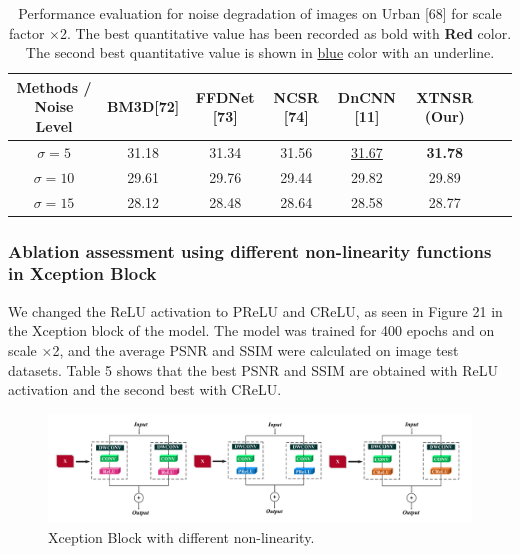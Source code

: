 \documentclass[twocolumn]{svjour3}          %
\begin{document}
\begin{table}
\centering
\caption{Performance evaluation for noise degradation of images on Urban [68] for scale factor $\times$2. The best quantitative value has been recorded as bold with {\color{red}\textbf{Red }} color. The second best quantitative value is shown in {\color{blue}\underline{blue}} color with an underline.}

\label{table4}
\setlength{\tabcolsep}{1 pt}
\begin{tabular}{|c|c|c|c|c|c|c|c|} %
\hline

\multirow{1}{*}{Methods / Noise Level} & \multirow{1}{*}{BM3D[72]} & \multirow{1}{*}{FFDNet [73]} & \multirow{1}{*}{NCSR [74]}  & \multirow{1}{*}{DnCNN [11]} & \multirow{1}{*}{XTNSR (Our)}\\

\hline
$\sigma = 5$ & {31.18} & {31.34} & {31.56} & {\color{blue}\underline{31.67}} & {\color{red}\textbf{31.78}}   \\
$\sigma = 10$ & {29.61} & {29.76} & {29.44} & {29.82} & {29.89}   \\
$\sigma = 15$ & {28.12} & {28.48} & {28.64} & {28.58} & {28.77}   \\
    
\hline
\end{tabular}
\end{table}

\subsubsection{Ablation assessment using different non-linearity functions in Xception Block}

We changed the ReLU activation to PReLU and CReLU, as seen in Figure 21 in the Xception block of the model. The model was trained for 400 epochs and on scale ×2, and the average PSNR and SSIM were calculated on image test datasets. Table 5 shows that the best PSNR and SSIM are obtained with ReLU activation and the second best with CReLU.

\begin{figure}
    \centering
    \includegraphics[width=\linewidth]{21Figure.pdf}
    \caption{Xception Block with different non-linearity.}
    \label{fig:21}
\end{figure}
\end{document}
